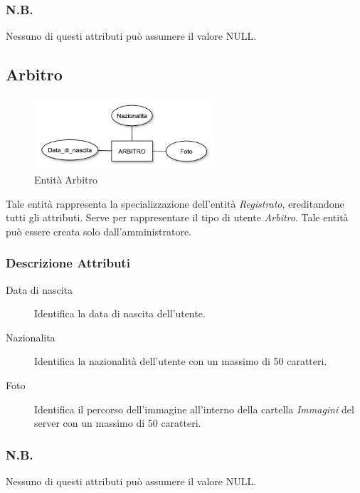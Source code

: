 		\subsubsection*{N.B.}
		Nessuno di questi attributi può assumere il valore NULL.
	
	\subsection{Arbitro}
		
		\begin{figure}[h]
			\centering
			\includegraphics[width=0.6\textwidth]
			{immagini/04-arbitro}
			
			\caption{Entità Arbitro}
		\end{figure}
		
		Tale entità rappresenta la specializzazione dell'entità \emph{Registrato}, ereditandone tutti gli attributi. Serve per rappresentare il tipo di utente \emph{Arbitro}. Tale entità può essere creata solo dall'amministratore.
		
		\subsubsection*{Descrizione Attributi}
		
		\begin{description}
			
			\item[Data di nascita]
			Identifica la data di nascita dell'utente.
			
			\item[Nazionalita]
			Identifica la nazionalità dell'utente con un massimo di 50 caratteri.
			
			\item[Foto]
			Identifica il percorso dell'immagine all'interno della cartella \emph{Immagini} del server con un massimo di 50 caratteri.
			
		\end{description}
		
		\subsubsection*{N.B.}
		Nessuno di questi attributi può assumere il valore NULL.
	
